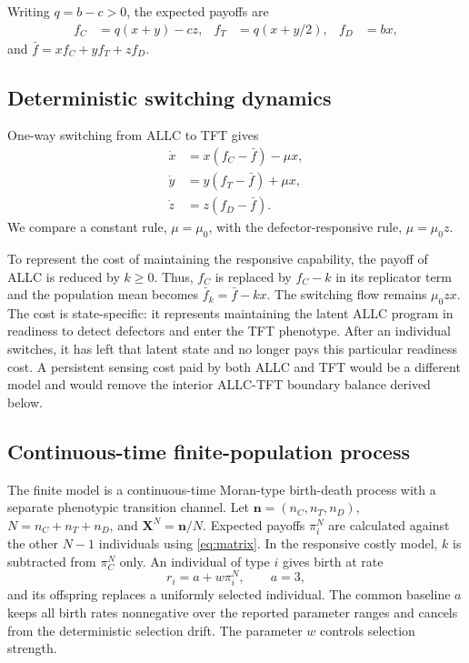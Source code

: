 \documentclass[pdflatex,sn-mathphys-ay]{sn-jnl}
\theoremstyle{thmstyleone}
\begin{document}
Writing $q=b-c>0$, the expected payoffs are
\begin{align}
f_C &= q(x+y)-cz, &
f_T &= q(x+y/2), &
f_D &= bx, \label{eq:payoffs}
\end{align}
and $\bar f=xf_C+yf_T+zf_D$.

\subsection{Deterministic switching dynamics}

One-way switching from ALLC to TFT gives
\begin{align}
\dot x &=x(f_C-\bar f)-\mu x,\nonumber\\
\dot y &=y(f_T-\bar f)+\mu x,\label{eq:replicator}\\
\dot z &=z(f_D-\bar f).\nonumber
\end{align}
We compare a constant rule, $\mu=\mu_0$, with the defector-responsive rule, $\mu=\mu_0z$.

To represent the cost of maintaining the responsive capability, the payoff of ALLC is reduced by $k\geq0$. Thus, $f_C$ is replaced by $f_C-k$ in its replicator term and the population mean becomes $\bar f_k=\bar f-kx$. The switching flow remains $\mu_0zx$. The cost is state-specific: it represents maintaining the latent ALLC program in readiness to detect defectors and enter the TFT phenotype. After an individual switches, it has left that latent state and no longer pays this particular readiness cost. A persistent sensing cost paid by both ALLC and TFT would be a different model and would remove the interior ALLC-TFT boundary balance derived below.

\subsection{Continuous-time finite-population process}

The finite model is a continuous-time Moran-type birth-death process with a separate phenotypic transition channel. Let $\boldsymbol n=(n_C,n_T,n_D)$, $N=n_C+n_T+n_D$, and $\boldsymbol X^N=\boldsymbol n/N$. Expected payoffs $\pi_i^N$ are calculated against the other $N-1$ individuals using \eqref{eq:matrix}. In the responsive costly model, $k$ is subtracted from $\pi_C^N$ only. An individual of type $i$ gives birth at rate
\begin{equation}
r_i=a+w\pi_i^N,\qquad a=3,
\label{eq:birthrate}
\end{equation}
and its offspring replaces a uniformly selected individual. The common baseline $a$ keeps all birth rates nonnegative over the reported parameter ranges and cancels from the deterministic selection drift. The parameter $w$ controls selection strength.
\end{document}
